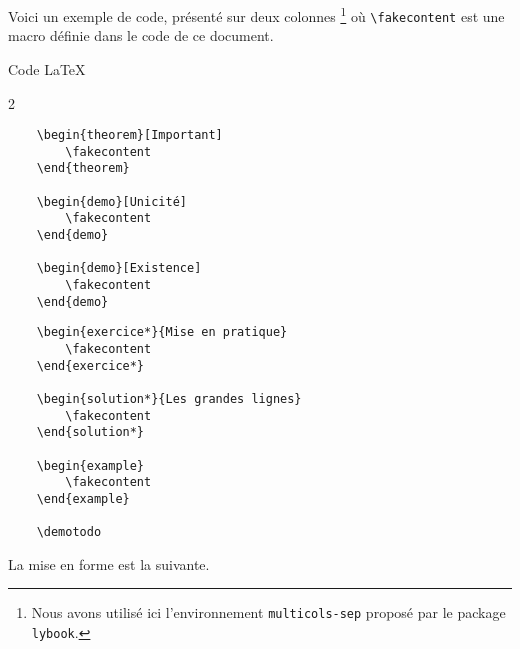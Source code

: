 Voici un exemple de code, présenté sur deux colonnes
\footnote{
	Nous avons utilisé ici l'environnement \texttt{multicols-sep} proposé par le package \texttt{lybook}.
}
où \verb+\fakecontent+ est une macro définie dans le code de ce document.

\begin{frame-gene}{Code \LaTeX}
	\small
	\begin{multicols-sep}{2}
		\begin{verbatim}
	\begin{theorem}[Important]
    	\fakecontent
	\end{theorem}

	\begin{demo}[Unicité]
    	\fakecontent
	\end{demo}

	\begin{demo}[Existence]
    	\fakecontent
	\end{demo}
		\end{verbatim}


		\columnbreak


		\begin{verbatim}
	\begin{exercice*}{Mise en pratique}
    	\fakecontent
	\end{exercice*}

	\begin{solution*}{Les grandes lignes}
    	\fakecontent
	\end{solution*}

	\begin{example}
	    \fakecontent
	\end{example}

	\demotodo
		\end{verbatim}
	\end{multicols-sep}
\end{frame-gene}




La mise en forme est la suivante.

